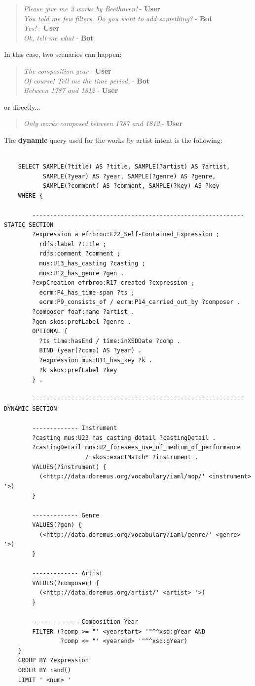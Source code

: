 \documentclass[a4paper,12pt]{report}
\begin{document}
	\begin{verse}
	\textit{Please give me 3 works by Beethoven!} - \textbf{User}\\
	\textit{You told me few filters. Do you want to add something?} - \textbf{Bot}\\
	\textit{Yes!} - \textbf{User}\\
	\textit{Ok, tell me what} - \textbf{Bot}\\
	\end{verse}
	In this case, two scenarios can happen:
	\begin{verse}
	\textit{The composition year} - \textbf{User}\\
	\textit{Of course! Tell me the time period.} - \textbf{Bot}\\
	\textit{Between 1787 and 1812} - \textbf{User}\\
	\end{verse}
	or directly...
	\begin{verse}
	\textit{Only works composed between 1787 and 1812} - \textbf{User}\\
	\end{verse}
	The \textbf{dynamic} query used for the works by artist intent is the following:
	\begin{lstlisting}
	
	SELECT SAMPLE(?title) AS ?title, SAMPLE(?artist) AS ?artist,
	       SAMPLE(?year) AS ?year, SAMPLE(?genre) AS ?genre,
	       SAMPLE(?comment) AS ?comment, SAMPLE(?key) AS ?key
	WHERE {
	
		------------------------------------------------------------ STATIC SECTION
		?expression a efrbroo:F22_Self-Contained_Expression ;
		  rdfs:label ?title ;
		  rdfs:comment ?comment ;
		  mus:U13_has_casting ?casting ;
		  mus:U12_has_genre ?gen .
		?expCreation efrbroo:R17_created ?expression ;
		  ecrm:P4_has_time-span ?ts ;
		  ecrm:P9_consists_of / ecrm:P14_carried_out_by ?composer .
		?composer foaf:name ?artist .
		?gen skos:prefLabel ?genre .
		OPTIONAL {
		  ?ts time:hasEnd / time:inXSDDate ?comp .
		  BIND (year(?comp) AS ?year) .
		  ?expression mus:U11_has_key ?k .
		  ?k skos:prefLabel ?key
		} .
		
		------------------------------------------------------------ DYNAMIC SECTION
		
		------------- Instrument
		?casting mus:U23_has_casting_detail ?castingDetail .
		?castingDetail mus:U2_foresees_use_of_medium_of_performance
		               / skos:exactMatch* ?instrument .
		VALUES(?instrument) {
		  (<http://data.doremus.org/vocabulary/iaml/mop/' <instrument> '>)
		}
		
		------------- Genre
		VALUES(?gen) {
		  (<http://data.doremus.org/vocabulary/iaml/genre/' <genre> '>)
		}
		
		------------- Artist
		VALUES(?composer) {
		  (<http://data.doremus.org/artist/' <artist> '>)
		}
		
		------------- Composition Year
		FILTER (?comp >= "' <yearstart> '"^^xsd:gYear AND
		        ?comp <= "' <yearend> '"^^xsd:gYear)
	}
	GROUP BY ?expression
	ORDER BY rand()
	LIMIT ' <num> '
	\end{lstlisting}
\end{document}

